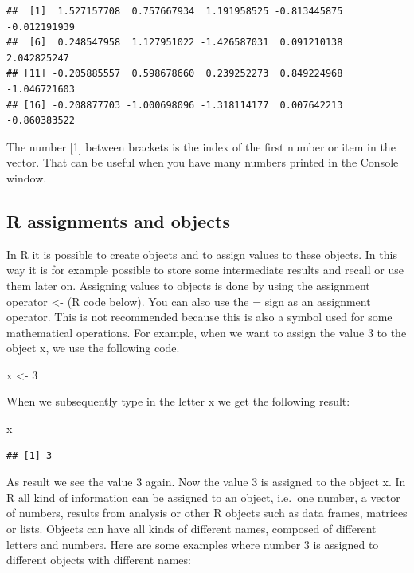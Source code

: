 \documentclass[]{book}
\newenvironment{Shaded}{\begin{snugshade}}{\end{snugshade}}
\newcommand{\DecValTok}[1]{\textcolor[rgb]{0.00,0.00,0.81}{#1}}
\newcommand{\StringTok}[1]{\textcolor[rgb]{0.31,0.60,0.02}{#1}}
\newcommand{\NormalTok}[1]{#1}
\theoremstyle{definition}
\theoremstyle{definition}
\theoremstyle{definition}
\theoremstyle{remark}
\begin{document}
\begin{verbatim}
##  [1]  1.527157708  0.757667934  1.191958525 -0.813445875 -0.012191939
##  [6]  0.248547958  1.127951022 -1.426587031  0.091210138  2.042825247
## [11] -0.205885557  0.598678660  0.239252273  0.849224968 -1.046721603
## [16] -0.208877703 -1.000698096 -1.318114177  0.007642213 -0.860383522
\end{verbatim}

The number {[}1{]} between brackets is the index of the first number or
item in the vector. That can be useful when you have many numbers
printed in the Console window.

\subsection{R assignments and objects}\label{r-assignments-and-objects}

In R it is possible to create objects and to assign values to these
objects. In this way it is for example possible to store some
intermediate results and recall or use them later on. Assigning values
to objects is done by using the assignment operator \textless{}- (R code
below). You can also use the = sign as an assignment operator. This is
not recommended because this is also a symbol used for some mathematical
operations. For example, when we want to assign the value 3 to the
object x, we use the following code.

\begin{Shaded}
\begin{Highlighting}[]
\NormalTok{x <-}\StringTok{ }\DecValTok{3} 
\end{Highlighting}
\end{Shaded}

When we subsequently type in the letter x we get the following result:

\begin{Shaded}
\begin{Highlighting}[]
\NormalTok{x }
\end{Highlighting}
\end{Shaded}

\begin{verbatim}
## [1] 3
\end{verbatim}

As result we see the value 3 again. Now the value 3 is assigned to the
object x. In R all kind of information can be assigned to an object,
i.e.~one number, a vector of numbers, results from analysis or other R
objects such as data frames, matrices or lists. Objects can have all
kinds of different names, composed of different letters and numbers.
Here are some examples where number 3 is assigned to different objects
with different names:
\end{document}
